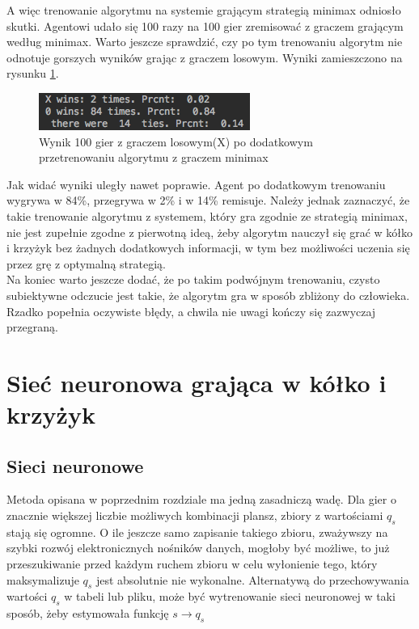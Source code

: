 \documentclass[licencjacka]{pracamgr}
\begin{document}
A więc trenowanie algorytmu na systemie grającym strategią minimax odniosło skutki.  Agentowi udało się 100 razy na 100 gier zremisować z graczem grającym według minimax. Warto jeszcze sprawdzić, czy po tym trenowaniu algorytm nie odnotuje gorszych wyników grając z graczem losowym. Wyniki zamieszczono na rysunku \ref{Rys19}.\\

\begin{figure}[h!]
	\includegraphics [scale=0.7]{QTable_vs_Rnd_trained_d.png}
	\caption{Wynik 100 gier z graczem losowym(X) po dodatkowym przetrenowaniu algorytmu z graczem minimax}
	\label{Rys19}
\end{figure}

Jak widać wyniki uległy nawet poprawie. Agent po dodatkowym trenowaniu wygrywa w 84\%, przegrywa w 2\% i w 14\% remisuje. Należy jednak zaznaczyć, że takie trenowanie algorytmu z systemem, który gra zgodnie ze strategią minimax, nie jest zupełnie zgodne z pierwotną ideą, żeby algorytm nauczył się grać w kółko i krzyżyk bez żadnych dodatkowych informacji, w tym bez możliwości uczenia się przez grę z optymalną strategią. \\

Na koniec warto jeszcze dodać, że po takim podwójnym trenowaniu, czysto subiektywne odczucie jest takie, że algorytm gra w sposób zbliżony do człowieka. Rzadko popełnia oczywiste błędy, a chwila nie uwagi kończy się zazwyczaj przegraną. 

 
\chapter{Sieć neuronowa grająca w kółko i krzyżyk }\label{r:Siec}

\section{Sieci neuronowe}
Metoda opisana w poprzednim rozdziale ma jedną zasadniczą wadę. Dla gier o znacznie większej liczbie możliwych kombinacji plansz, zbiory z wartościami $q_{s}$ stają się ogromne. O ile jeszcze samo zapisanie takiego zbioru, zważywszy na szybki rozwój elektronicznych nośników danych, mogłoby być możliwe, to już przeszukiwanie przed każdym ruchem zbioru w celu wyłonienie tego, który maksymalizuje $q_{s}$ jest absolutnie nie wykonalne. Alternatywą do przechowywania wartości $q_{s}$ w tabeli lub pliku, może być wytrenowanie sieci neuronowej w taki sposób, żeby estymowała funkcję $s\rightarrow q_{s}$\\
\end{document}
